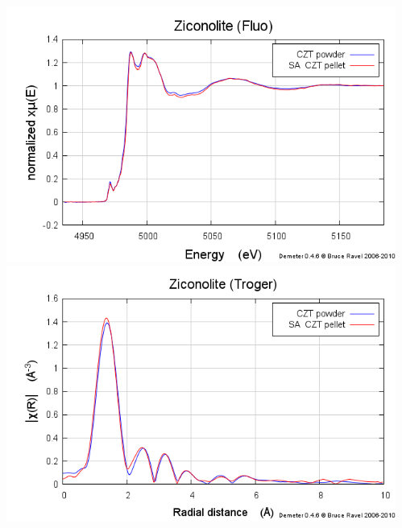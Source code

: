 \documentclass[10pt, xcolor=x11names, compress]{beamer}
\begin{document}
\begin{frame}
\begin{columns}
\begin{column}{0.5\linewidth}
\begin{center}
      \end{center}
    \end{column}
    \begin{column}{0.5\linewidth}
      \begin{center}
        \includegraphics[width=0.8\linewidth]{images/zirconolite_mu.png}\\
        \includegraphics[width=0.8\linewidth]{images/zirconolite_chir.png}
      \end{center}
    \end{column}
  \end{columns}
\end{frame}
\end{document}
